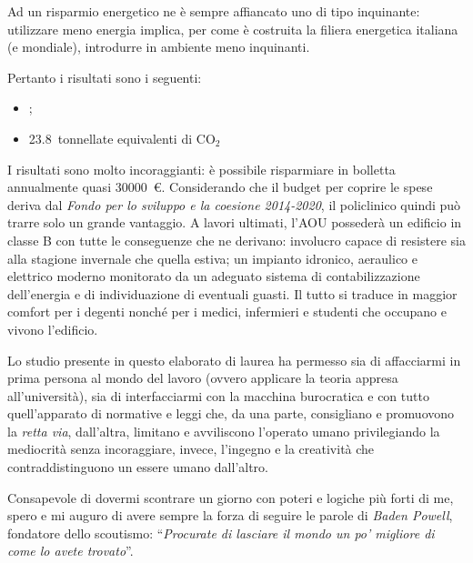 Ad un risparmio energetico ne è sempre affiancato uno di tipo inquinante: utilizzare meno energia implica, per come è costruita la filiera energetica italiana (e mondiale), introdurre in ambiente meno inquinanti.

Pertanto i risultati sono i seguenti:
\begin{itemize}
	\item {}; %
	\item \num{23.8}\ tonnellate equivalenti di $\mathrm{CO_2}$ %
\end{itemize}

I risultati sono molto incoraggianti: è possibile risparmiare in bolletta annualmente quasi \num{30000}\ \euro. Considerando che il budget per coprire le spese deriva dal \emph{Fondo per lo sviluppo e la coesione 2014-2020}, il policlinico quindi può trarre solo un grande vantaggio. A lavori ultimati, l'AOU possederà un edificio in classe B con tutte le conseguenze che ne derivano: involucro capace di resistere sia alla stagione invernale che quella estiva; un impianto idronico, aeraulico e elettrico moderno monitorato da un adeguato sistema di contabilizzazione dell'energia e di individuazione di eventuali guasti. Il tutto si traduce in maggior comfort per i degenti nonché per i medici, infermieri e studenti che occupano e vivono l'edificio.


Lo studio presente in questo elaborato di laurea ha permesso sia di affacciarmi in prima persona al mondo del lavoro (ovvero applicare la teoria appresa all'università), sia di interfacciarmi con la macchina burocratica e con tutto quell'apparato di normative e leggi che, da una parte, consigliano e promuovono la \emph{retta via}, dall'altra, limitano e avviliscono l'operato umano privilegiando la mediocrità senza incoraggiare, invece, l'ingegno e la creatività che contraddistinguono un essere umano dall'altro.

Consapevole di dovermi scontrare un giorno con poteri e logiche più forti di me, spero e mi
 auguro di avere sempre la forza di seguire le parole di \emph{Baden Powell}, fondatore dello scoutismo: ``\emph{Procurate di lasciare il mondo un po' migliore di come lo avete trovato}''.